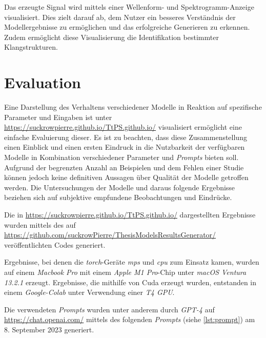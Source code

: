 \documentclass[
  a4paper,  %
  twoside,  %
  bibliography=totoc,
  headsepline,
  cleardoublepage=empty,
  parskip=half,
  draft=false
]{scrbook}
\begin{document}
Das erzeugte Signal wird mittels einer Wellenform- und Spektrogramm-Anzeige visualisiert. Dies zielt darauf ab, dem Nutzer ein besseres Verständnis der Modellergebnisse zu ermöglichen und das erfolgreiche Generieren zu erkennen. Zudem ermöglicht diese Visualisierung die Identifikation bestimmter Klangstrukturen.


\section{Evaluation}

Eine Darstellung des Verhaltens verschiedener Modelle in Reaktion auf spezifische Parameter und Eingaben ist unter \url{https://suckrowpierre.github.io/TtPS.github.io/} \cite{pierre-louis_suckrow_text-zu-spielbarem-klang_nodate} visualisiert ermöglicht eine einfache Evaluierung dieser. Es ist zu beachten, dass diese Zusammenstellung einen Einblick und einen ersten Eindruck in die Nutzbarkeit der verfügbaren Modelle in Kombination verschiedener Parameter und \emph{Prompts} bieten soll. Aufgrund der begrenzten Anzahl an Beispielen und dem Fehlen einer Studie können jedoch keine definitiven Aussagen über Qualität der Modelle getroffen werden. Die Untersuchungen der Modelle und daraus folgende Ergebnisse beziehen sich auf subjektive empfundene Beobachtungen und Eindrücke.  

Die in \url{https://suckrowpierre.github.io/TtPS.github.io/} \cite{pierre-louis_suckrow_text-zu-spielbarem-klang_nodate} dargestellten Ergebnisse wurden mittels des auf \url{https://github.com/suckrowPierre/ThesisModelsResultsGenerator/} veröffentlichten Codes generiert.

Ergebnisse, bei denen die \emph{torch}-Geräte \emph{mps} und \emph{cpu} zum Einsatz kamen, wurden auf einem \emph{Macbook Pro} mit einem \emph{Apple M1 Pro}-Chip unter \emph{macOS Ventura 13.2.1} erzeugt. Ergebnisse, die mithilfe von Cuda erzeugt wurden, entstanden in einem \emph{Google-Colab} unter Verwendung einer \emph{T4 GPU}.

Die verwendeten \emph{Prompts} wurden unter anderem durch \emph{GPT-4} \cite{openai_gpt-4_2023} auf \url{https://chat.openai.com/} mittels des folgenden \emph{Prompts} (siehe \ref{lst:prompt}) am 8. September 2023 generiert.
\end{document}

